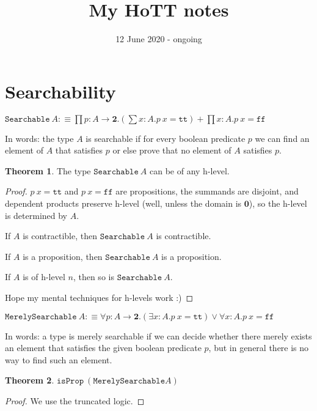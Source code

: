 \documentclass[11pt]{article}
\title{My HoTT notes}
\date{12 June 2020 - ongoing}
\theoremstyle{definition}
\newtheorem{theorem}{Theorem}[section]
\newcommand{\txt}[1]{\texttt{#1}}
\newcommand{\text}[1]{\texttt{#1}}
\renewcommand{\(}{\left(}
\renewcommand{\)}{\right)}
\newcommand{\defn}{:\equiv}
\newcommand{\isProp}{\text{isProp}}
\newcommand{\apl}[2]{#1\ #2}
\newcommand{\Empty}{\mathbf{0}}
\newcommand{\Bool}{\mathbf{2}}
\newcommand{\true}{\txt{tt}}
\newcommand{\false}{\txt{ff}}
\newcommand{\dprod}[2]{\prod #1.#2}
\newcommand{\dsum}[2]{\sum #1.#2}
\newcommand{\all}[2]{\forall #1.#2}
\newcommand{\ex}[2]{\exists #1.#2}
\begin{document}
\maketitle

\section{Searchability}

\newcommand{\Searchable}{\txt{Searchable}}

\begin{center}
$\displaystyle \apl{\Searchable}{A} \defn \dprod{p : A \to \Bool}{\(\dsum{x : A}{\apl{p}{x} = \true}\) + \dprod{x : A}{\apl{p}{x} = \false}}$
\end{center}

In words: the type $A$ is searchable if for every boolean predicate $p$ we can find an element of $A$ that satisfies $p$ or else prove that no element of $A$ satisfies $p$.

\begin{theorem}
The type $\apl{\Searchable}{A}$ can be of any h-level.
\end{theorem}
\begin{proof}
$\apl{p}{x} = \true$ and $\apl{p}{x} = \false$ are propositions, the summands are disjoint, and dependent products preserve h-level (well, unless the domain is $\Empty$), so the h-level is determined by $A$.

If $A$ is contractible, then $\apl{\Searchable}{A}$ is contractible.

If $A$ is a proposition, then $\apl{\Searchable}{A}$ is a proposition.

If $A$ is of h-level $n$, then so is $\apl{\Searchable}{A}$.

Hope my mental techniques for h-levels work :)

\end{proof}

\newcommand{\MerelySearchable}{\txt{MerelySearchable}}
\begin{center}
$\displaystyle \apl{\MerelySearchable}{A} \defn \all{p : A \to \Bool}{\(\ex{x : A}{\apl{p}{x} = \true}\) \lor \all{x : A}{\apl{p}{x} = \false}}$
\end{center}

In words: a type is merely searchable if we can decide whether there merely exists an element that satisfies the given boolean predicate $p$, but in general there is no way to find such an element.

\begin{theorem}
$\apl{\isProp}{(\MerelySearchable{A})}$
\end{theorem}
\begin{proof}
We use the truncated logic.
\end{proof}
\end{document}

